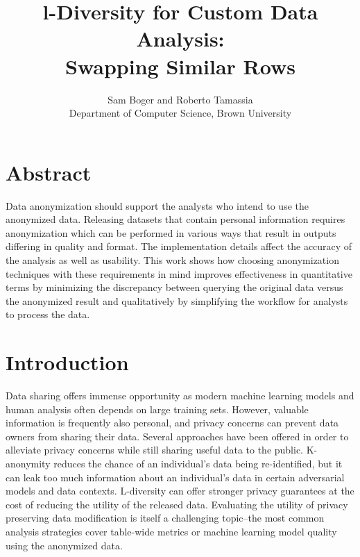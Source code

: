 

\date{}

\title{\Large \bf l-Diversity for Custom Data Analysis:\\
  Swapping Similar Rows}

\author{
{\rm Sam Boger and Roberto Tamassia} \\
Department of Computer Science, Brown University

} %

\maketitle
\section*{Abstract}
Data anonymization should support the analysts who intend to use the anonymized data. Releasing datasets that contain personal information requires anonymization which can be performed in various ways that result in outputs differing in quality and format. The implementation details affect the accuracy of the analysis as well as usability. This work shows how choosing anonymization techniques with these requirements in mind improves effectiveness in quantitative terms by minimizing the discrepancy between querying the original data versus the anonymized result and qualitatively by simplifying the workflow for analysts to process the data.

\section{Introduction}
Data sharing offers immense opportunity as modern machine learning models and human analysis often depends on large training sets. However, valuable information is frequently also personal, and privacy concerns can prevent data owners from sharing their data. Several approaches have been offered in order to alleviate privacy concerns while still sharing useful data to the public. K-anonymity reduces the chance of an individual’s data being re-identified, but it can leak too much information about an individual's data in certain adversarial models and data contexts. L-diversity can offer stronger privacy guarantees at the cost of reducing the utility of the released data. Evaluating the utility of privacy preserving data modification is itself a challenging topic--the most common analysis strategies cover table-wide metrics or machine learning model quality using the anonymized data.

